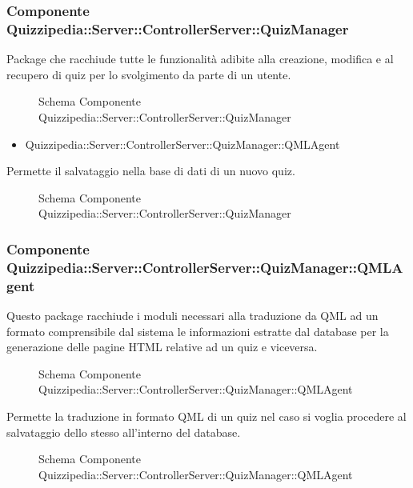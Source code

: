 \subsubsection{Componente Quizzipedia::Server::ControllerServer::QuizManager}
Package che racchiude tutte le funzionalità adibite alla creazione, modifica e al recupero di quiz per lo svolgimento da parte di un utente.
\begin{figure}[H]
\centering
\noindent{}
\caption{Schema Componente Quizzipedia::Server::ControllerServer::QuizManager}
\end{figure}
\begin{itemize}
\item Quizzipedia::Server::ControllerServer::QuizManager::QMLAgent
\end{itemize}
Permette il salvataggio nella base di dati di un nuovo quiz.
\begin{figure}[H]
\centering
\noindent{}
\caption{Schema Componente Quizzipedia::Server::ControllerServer::QuizManager}
\end{figure}
\subsubsection{Componente Quizzipedia::Server::ControllerServer::QuizManager::QMLAgent}
Questo package racchiude i moduli necessari alla traduzione da QML ad un formato comprensibile dal sistema le informazioni estratte dal database per la generazione delle pagine HTML relative ad un quiz e viceversa.
\begin{figure}[H]
\centering
\noindent{}
\caption{Schema Componente Quizzipedia::Server::ControllerServer::QuizManager::QMLAgent}
\end{figure}
Permette la traduzione in formato QML di un quiz nel caso si voglia procedere al salvataggio dello stesso all'interno del database.
\begin{figure}[H]
\centering
\noindent{}
\caption{Schema Componente Quizzipedia::Server::ControllerServer::QuizManager::QMLAgent}
\end{figure}
